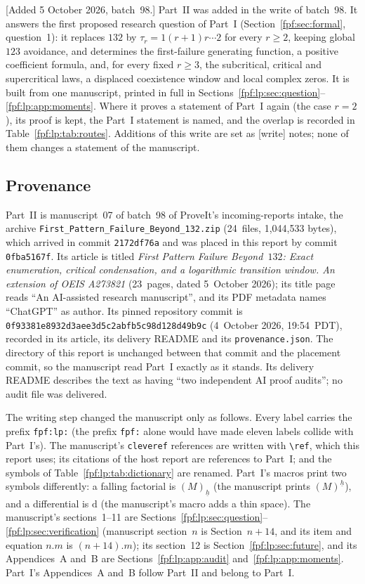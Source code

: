\documentclass[11pt]{article}
\numberwithin{equation}{section}
\theoremstyle{definition}
\newcommand{\fall}[2]{(#1)_{\underline{#2}}}
\newcommand{\dd}{\mathrm d}
\begin{document}
[Added 5 October 2026, batch~98.] Part~II was added in the write of
batch~98. It answers the first proposed research question of Part~I
(Section~\ref{fpf:sec:formal}, question~1): it replaces $132$ by
$\tau_r=1(r+1)r\cdots2$ for every $r\ge2$, keeping global $123$
avoidance, and determines the first-failure generating function, a positive
coefficient formula, and, for every fixed $r\ge3$, the subcritical,
critical and supercritical laws, a displaced coexistence window and local
complex zeros. It is built from one manuscript, printed in full in
Sections~\ref{fpf:lp:sec:question}--\ref{fpf:lp:app:moments}. Where it
proves a statement of Part~I again (the case $r=2$), its proof is kept, the
Part~I statement is named, and the overlap is recorded in
Table~\ref{fpf:lp:tab:routes}. Additions of this write are set as
\textsf{[write]} notes; none of them changes a statement of the manuscript.

\subsection{Provenance}\label{fpf:lp:sec:provenance}

Part~II is manuscript~07 of batch~98 of ProveIt's incoming-reports intake,
the archive \nolinkurl{First_Pattern_Failure_Beyond_132.zip} (24~files,
1{,}044{,}533 bytes), which arrived in commit \texttt{2172df76a} and was
placed in this report by commit \texttt{0fba5167f}. Its article is titled
\emph{First Pattern Failure Beyond~$132$: Exact enumeration, critical
condensation, and a logarithmic transition window. An extension of OEIS
A273821} (23~pages, dated 5~October 2026); its title page reads ``An
AI-assisted research manuscript'', and its PDF metadata names ``ChatGPT'' as
author. Its pinned repository commit is
\texttt{0f93381e8932d3aee3d5c2abfb5c98d128d49b9c} (4~October 2026,
19:54~PDT), recorded in its article, its delivery README and its
\texttt{provenance.json}. The directory of this report is unchanged between
that commit and the placement commit, so the manuscript read Part~I exactly
as it stands. Its delivery README describes the text as having ``two
independent AI proof audits''; no audit file was delivered.

The writing step changed the manuscript only as follows. Every label carries
the prefix \texttt{fpf:lp:} (the prefix \texttt{fpf:} alone would have made
eleven labels collide with Part~I's). The manuscript's \texttt{cleveref}
references are written with \verb|\ref|, which this report uses; its
citations of the host report are references to Part~I; and the symbols of
Table~\ref{fpf:lp:tab:dictionary} are renamed. Part~I's macros print two
symbols differently: a falling factorial is $\fall{M}{h}$ (the manuscript
prints $(M)^{\underline h}$), and a differential is $\dd$ (the manuscript's
macro adds a thin space). The manuscript's sections~1--11 are
Sections~\ref{fpf:lp:sec:question}--\ref{fpf:lp:sec:verification}
(manuscript section~$n$ is Section~$n+14$, and its item and equation
$n.m$ is $(n+14).m$); its section~12 is
Section~\ref{fpf:lp:sec:future}, and its Appendices~A and~B are
Sections~\ref{fpf:lp:app:audit} and~\ref{fpf:lp:app:moments}. Part~I's
Appendices~A and~B follow Part~II and belong to Part~I.
\end{document}

